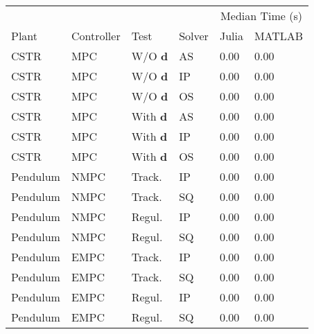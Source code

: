 \begin{tabular}{llllll}
	
\toprule %

	  &	& & & \multicolumn{2}{c}{Median Time (s)} \\ \cmidrule(l){5-6}
Plant & Controller & Test & Solver & Julia & MATLAB \\
\midrule %

CSTR		& MPC	& W/O $\mathbf{d}$	& AS & \num{0.00} & \num{0.00}	\\
CSTR		& MPC	& W/O $\mathbf{d}$	& IP & \num{0.00} & \num{0.00}	\\
CSTR		& MPC	& W/O $\mathbf{d}$	& OS & \num{0.00} & \num{0.00}	\\
CSTR		& MPC	& With $\mathbf{d}$ & AS & \num{0.00} & \num{0.00}	\\
CSTR		& MPC	& With $\mathbf{d}$ & IP & \num{0.00} & \num{0.00}	\\
CSTR		& MPC	& With $\mathbf{d}$ & OS & \num{0.00} & \num{0.00}	\\
Pendulum 	& NMPC	& Track. 	   		& IP & \num{0.00} & \num{0.00}	\\
Pendulum 	& NMPC	& Track. 	   		& SQ & \num{0.00} & \num{0.00}	\\
Pendulum    & NMPC	& Regul. 			& IP & \num{0.00} & \num{0.00} 	\\
Pendulum    & NMPC	& Regul. 			& SQ & \num{0.00} & \num{0.00} 	\\
Pendulum    & EMPC	& Track.			& IP & \num{0.00} & \num{0.00} 	\\
Pendulum    & EMPC	& Track.			& SQ & \num{0.00} & \num{0.00} 	\\
Pendulum	& EMPC	& Regul. 			& IP & \num{0.00} & \num{0.00}  \\
Pendulum	& EMPC	& Regul. 			& SQ & \num{0.00} & \num{0.00}  \\
	
\bottomrule %
	
\end{tabular}